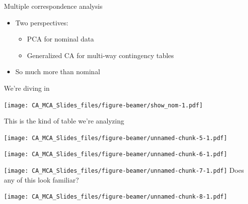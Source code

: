 \documentclass[
  ignorenonframetext,
]{beamer}
\providecommand{\tightlist}{%
  \setlength{\itemsep}{0pt}\setlength{\parskip}{0pt}}
\begin{document}
\begin{frame}{Multiple correspondence analysis}
\protect\hypertarget{multiple-correspondence-analysis-1}{}

\begin{itemize}[<+->]
\tightlist
\item
  Two perspectives:

  \begin{itemize}[<+->]
  \tightlist
  \item
    PCA for nominal data
  \item
    Generalized CA for multi-way contingency tables
  \end{itemize}
\item
  So much more than nominal
\end{itemize}

\end{frame}

\begin{frame}{We're diving in}
\protect\hypertarget{were-diving-in-1}{}

\texttt{[image: CA\_MCA\_Slides\_files/figure-beamer/show\_nom-1.pdf]}

This is the kind of table we're analyzing

\end{frame}

\begin{frame}

\texttt{[image: CA\_MCA\_Slides\_files/figure-beamer/unnamed-chunk-5-1.pdf]}

\end{frame}

\begin{frame}

\texttt{[image: CA\_MCA\_Slides\_files/figure-beamer/unnamed-chunk-6-1.pdf]}

\end{frame}

\begin{frame}

\texttt{[image: CA\_MCA\_Slides\_files/figure-beamer/unnamed-chunk-7-1.pdf]}
Does any of this look familiar?

\end{frame}

\begin{frame}

\texttt{[image: CA\_MCA\_Slides\_files/figure-beamer/unnamed-chunk-8-1.pdf]}

\end{frame}
\end{document}
